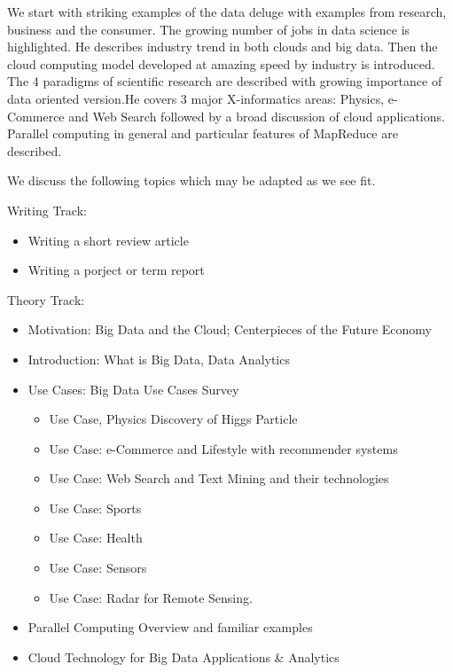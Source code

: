 We start with striking examples of the data deluge
with examples from research, business and the consumer. The growing
number of jobs in data science is highlighted. He describes industry
trend in both clouds and big data. Then the cloud computing model
developed at amazing speed by industry is introduced. The 4 paradigms of
scientific research are described with growing importance of data
oriented version.He covers 3 major X-informatics areas: Physics,
e-Commerce and Web Search followed by a broad discussion of cloud
applications. Parallel computing in general and particular features of
MapReduce are described.

We discuss the following topics which may be adapted as we see fit. 

Writing Track:

\begin{itemize}
\item  Writing a short review article
\item  Writing a porject or term report
\end{itemize}

Theory Track:

\begin{itemize}
\item  Motivation: Big Data and the Cloud; Centerpieces of the Future Economy
\item  Introduction: What is Big Data, Data Analytics
\item  Use Cases: Big Data Use Cases Survey

  \begin{itemize}
  \item    Use Case, Physics Discovery of Higgs Particle
  \item    Use Case: e-Commerce and Lifestyle with recommender systems
  \item    Use Case: Web Search and Text Mining and their technologies
  \item    Use Case: Sports
  \item    Use Case: Health
  \item    Use Case: Sensors
  \item    Use Case: Radar for Remote Sensing.
  \end{itemize}

\item Parallel Computing Overview and familiar examples
\item Cloud Technology for Big Data Applications \& Analytics
\end{itemize}

